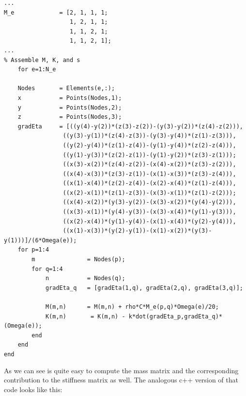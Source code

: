 \documentclass[12pt]{article}
\begin{document}
\begin{lstlisting}
...
M_e             = [2, 1, 1, 1; 
                   1, 2, 1, 1;
                   1, 1, 2, 1;
                   1, 1, 2, 1];
...
% Assemble M, K, and s
    for e=1:N_e
	
	Nodes       = Elements(e,:);
	x           = Points(Nodes,1);
	y           = Points(Nodes,2);
	z           = Points(Nodes,3);
	gradEta  	= [((y(4)-y(2))*(z(3)-z(2))-(y(3)-y(2))*(z(4)-z(2))), 
				 ((y(3)-y(1))*(z(4)-z(3))-(y(3)-y(4))*(z(1)-z(3))), 
				 ((y(2)-y(4))*(z(1)-z(4))-(y(1)-y(4))*(z(2)-z(4))), 
				 ((y(1)-y(3))*(z(2)-z(1))-(y(1)-y(2))*(z(3)-z(1)));
				 ((x(3)-x(2))*(z(4)-z(2))-(x(4)-x(2))*(z(3)-z(2))), 
				 ((x(4)-x(3))*(z(3)-z(1))-(x(1)-x(3))*(z(3)-z(4))), 
				 ((x(1)-x(4))*(z(2)-z(4))-(x(2)-x(4))*(z(1)-z(4))), 
				 ((x(2)-x(1))*(z(1)-z(3))-(x(3)-x(1))*(z(1)-z(2)));
				 ((x(4)-x(2))*(y(3)-y(2))-(x(3)-x(2))*(y(4)-y(2))), 
				 ((x(3)-x(1))*(y(4)-y(3))-(x(3)-x(4))*(y(1)-y(3))), 
				 ((x(2)-x(4))*(y(1)-y(4))-(x(1)-x(4))*(y(2)-y(4))), 
				 ((x(1)-x(3))*(y(2)-y(1))-(x(1)-x(2))*(y(3)-y(1)))]/(6*Omega(e)); 
	for p=1:4
		m               = Nodes(p);
		for q=1:4 
			n           = Nodes(q);
			gradEta_q   = [gradEta(1,q), gradEta(2,q), gradEta(3,q)];
							
			M(m,n)      = M(m,n) + rho*C*M_e(p,q)*Omega(e)/20;
			K(m,n)       = K(m,n) - k*dot(gradEta_p,gradEta_q)*(Omega(e));
		end
	end
end
\end{lstlisting}

As we can see is quite easy to compute the mass matrix and the corresponding contribution to the stiffness matrix as well. The analogous c++ version of that code looks like this: 
\end{document}
